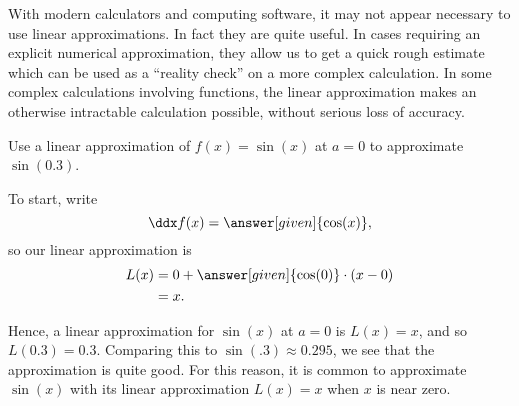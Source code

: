 \documentclass{ximera}
\begin{document}
With modern calculators and computing software, it may not appear
necessary to use linear approximations. In fact they are quite
useful. In cases requiring an explicit numerical approximation, they
allow us to get a quick rough estimate which can be used as a
``reality check'' on a more complex calculation. In some complex
calculations involving functions, the linear approximation makes an
otherwise intractable calculation possible, without serious loss of
accuracy.

\begin{example}%
Use a linear approximation of $f(x) =\sin(x)$ at $a=0$ to approximate
$\sin(0.3)$.
\begin{explanation}
To start, write
\[
\ddx f(x) = \answer[given]{\cos(x)},
\]
so our linear approximation is
\begin{align*}
L(x) &= 0+\answer[given]{\cos(0)}\cdot(x-0)\\
&= x.
\end{align*}
\begin{image}
\end{image}
Hence, a linear approximation for $\sin(x)$ at $a=0$ is $L(x) = x$,
and so $L(0.3) = 0.3$.  Comparing this to $\sin(.3) \approx 0.295$,
we see that the approximation is quite good. For this reason, it is common
to approximate $\sin(x)$ with its linear approximation $L(x) = x$
when $x$ is near zero.  
\end{explanation}
\end{example}
\end{document}
